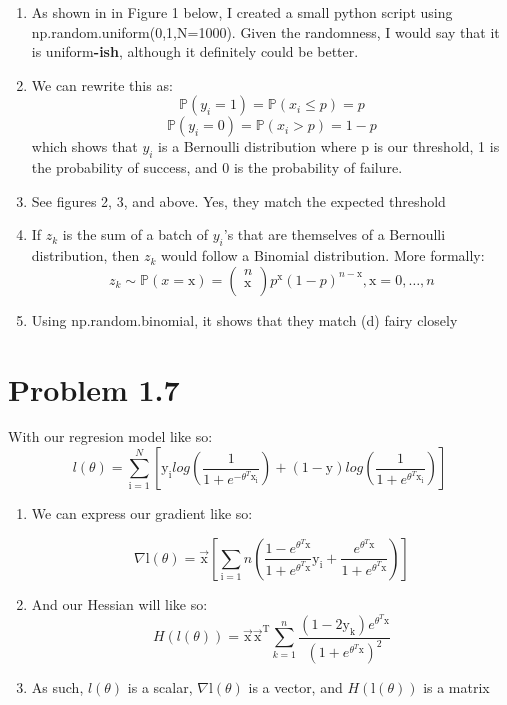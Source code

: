 \documentclass{article}
\begin{document}
\begin{enumerate}[label=(\alph*)]
    \item As shown in in Figure 1 below, I created a small python script using np.random.uniform(0,1,N=1000). Given the randomness, I would say that it is uniform\textbf{-ish}, although it definitely could be better.
    
    \item We can rewrite this as:
    \[\mathbb{P}(y_i = 1) = \mathbb{P}(x_i \le p) = p\]
    \[\mathbb{P}(y_i = 0) = \mathbb{P}(x_i > p) = 1 - p\]
    which shows that $y_i$ is a Bernoulli distribution where p is our threshold, 1 is the probability of success, and 0 is the probability of failure.
    
    \item See figures 2, 3, and above. Yes, they match the expected threshold
    \item If $z_k$ is the sum of a batch of $y_i$'s that are themselves of a Bernoulli distribution, then $z_k$ would follow a Binomial distribution. More formally:
    \[z_k \sim \mathbb{P}(x = \mathrm{x})= 
    \begin{pmatrix} 
      n \\ 
      \mathrm{x} \\ 
    \end{pmatrix}p^\mathrm{x}(1-p)^{n -\mathrm{x}}, \mathrm{x} = 0, \dots, n \]
    \item Using np.random.binomial, it shows that they match (d) fairy closely
\end{enumerate}

\FloatBarrier
\section*{Problem 1.7}
With our regresion model like so:
    \[l(\theta) = \sum_{\mathrm{i} = 1}^{N} [\mathrm{y_i} log(\frac{1}{1+e^{-\theta^T\mathrm{x_i}}}) + (1 - \mathrm{y})log(\frac{1}{1+e^{\theta^T\mathrm{x_i}}})]  \]
\begin{enumerate}[label=(\alph*)]
    \item We can express our gradient like so:
    
    \[\nabla \mathrm{l}(\theta) = \vec{\mathrm{x}}[\sum_{\mathrm{i}=1}{n}(\frac{1-e^{\theta^T\mathrm{x}}}{1+e^{\theta^T\mathrm{x}}}\mathrm{y_i} + \frac{e^{\theta^T\mathrm{x}}}{1+e^{\theta^T\mathrm{x}}})]\]
    
    \item And our Hessian will like so:
    \[ H(l(\theta))= \mathrm{\vec{x}\vec{x}^T}\sum_{k=1}^{n}\frac{(1-2\mathrm{y_k})e^{\theta^T\mathrm{x}}}{(1+e^{\theta^T\mathrm{x}})^2} \]
    \item As such, $l(\theta)$ is a scalar, $\nabla \mathrm{l}(\theta)$ is a vector, and $H(\mathrm{l}(\theta))$ is a matrix
\end{enumerate}
\end{document}
